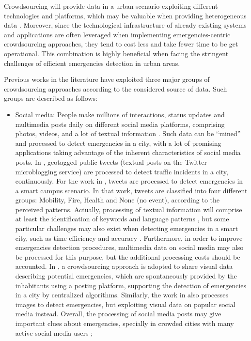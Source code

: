 \begin{refsection}
Crowdsourcing will provide data in a urban scenario exploiting different technologies and platforms, which may be valuable when providing heterogeneous data \cite{crowdsourcing6}. Moreover, since the technological infrastructure of already existing systems and applications are often leveraged when implementing emergencies-centric crowdsourcing approaches, they tend to cost less and take fewer time to be get operational. This combination is highly beneficial when facing the stringent challenges of efficient emergencies detection in urban areas.

Previous works in the literature have exploited three major groups of crowdsourcing approaches according to the considered source of data. Such groups are described as follows:  

\begin{itemize}

    \item Social media: People make millions of interactions, status updates and multimedia posts daily on different social media platforms, comprising photos, videos, and a lot of textual information \cite{socialmedia2}. Such data can be ``mined'' and processed to detect emergencies in a city, with a lot of promising applications taking advantage of the inherent characteristics of social media posts. In \cite{socialmedia3}, geotagged public tweets (textual posts on the Twitter microblogging service) are processed to detect traffic incidents in a city, continuously. For the work in \cite{twitter4}, tweets are processed to detect emergencies in a smart campus scenario. In that work, tweets are classified into four different groups: Mobility, Fire, Health and None (no event), according to the perceived patterns. Actually, processing of textual information will comprise at least the identification of keywords and language patterns \cite{twitter1}, but some particular challenges may also exist when detecting emergencies in a smart city, such as time efficiency and accuracy \cite{socialmediatime1}. Furthermore, in order to improve emergencies detection procedures, multimedia data on social media may also be processed for this purpose, but the additional processing costs should be accounted. In \cite{crowdsourcing5}, a crowdsourcing approach is adopted to share visual data describing potential emergencies, which are spontaneously provided by the inhabitants using a posting platform, supporting the detection of emergencies in a city by centralized algorithms. Similarly, the work in \cite{crowdsourcing7} also processes images to detect emergencies, but exploiting visual data on popular social media instead. Overall, the processing of social media posts may give important clues about emergencies, specially in crowded cities with many active social media users \cite{socialmedia4,twitter4};
    

\end{itemize}
\end{refsection}
